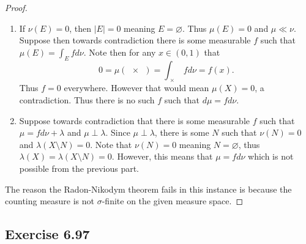 \documentclass[hw_all.tex]{subfiles}
\begin{document}
\begin{proof}
    \begin{enumerate}
        \item If $\nu(E) = 0$, then $|E| = 0$ meaning $E = \varnothing$. Thus $\mu(E) = 0$ and $\mu \ll \nu$. Suppose then towards contradiction there is some measurable $f$ such that $\mu(E) = \int_E f d \nu$. Note then for any $x \in (0,1)$ that
            \[
                0 = \mu(\qty{x}) = \int_{\qty{x}} f d \nu = f(x)
            .\]
            Thus $f = 0$ everywhere. However that would mean $\mu(X) = 0$, a contradiction. Thus there is no such $f$ such that $d \mu = f d \nu$.

        \item 
            Suppose towards contradiction that there is some measurable $f$ such that $\mu = f d \nu + \lambda$ and $\mu \perp \lambda$. Since $\mu \perp \lambda$, there is some $N$ such that $\nu(N) = 0$ and $\lambda(X \setminus N) = 0$. Note that $\nu(N) = 0$ meaning $N = \varnothing$, thus $\lambda(X) = \lambda(X \setminus N) = 0$. However, this means that $\mu = f d \nu$ which is not possible from the previous part.
    \end{enumerate}
    The reason the Radon-Nikodym theorem fails in this instance is because the counting measure is not $\sigma$-finite on the given measure space.
\end{proof}

\subsection{Exercise 6.97}
\end{document}
